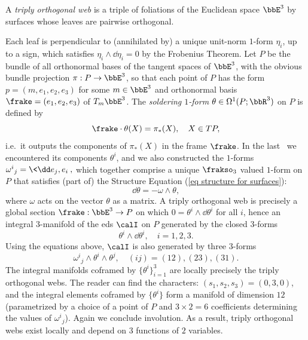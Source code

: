 \begin{example}
    A \emph{triply orthogonal web} is a triple of foliations of the Euclidean space $\bbE^3$ by surfaces whose leaves are pairwise orthogonal. 

    Each leaf is perpendicular to (annihilated by) a unique unit-norm $1$-form $\eta_i$, up to a sign, which satisfies $\eta_i\wedge\dd\eta_i=0$ by the Frobenius Theorem. Let $P$ be the bundle of all orthonormal bases of the tangent spaces of $\bbE^3$, with the obvious bundle projection $\pi:P\to \bbE^3$, so that each point of $P$ has the form $p=(m,e_1,e_2,e_3)$ for some $m\in \bbE^3$ and orthonormal basis $\frake=(e_1,e_2,e_3)$ of $T_{m}\bbE^3$. The \emph{soldering $1$-form} $\theta\in \Omega^1(P;\bbR^3)$ on $P$ is defined by 
    \[\frake\cdot \theta(X)=\pi_\ast(X),\quad X\in TP,\]
    i.e.\ it outputs the components of $\pi_\ast(X)$ in the frame $\frake$. In the last \subsect\ we encountered its components $\theta^i$, and we also constructed the $1$-forms 
    $\omega^i{}_j=\<\dd e_j,e_i\>,$
    which together comprise a unique $\frakso_3$ valued $1$-form on $P$ that satisfies (part of) the Structure Equation (\ref{eq structure for surfaces}):
    \[\dd \theta=-\omega\wedge\theta,\]
    where $\omega$ acts on the vector $\theta$ as a matrix. A triply orthogonal web is precisely a global section $\frake:\bbE^3\to P$  on which $0=\theta^i\wedge \dd\theta^i$ for all $i$, hence an integral $3$-manifold of the \gls{eds} $\calI$ on $P$ generated by the closed $3$-forms 
    \[\theta^i\wedge\dd\theta^i,\quad i=1,2,3.\]
    Using the equations above, $\calI$ is also generated by three $3$-forms
    \[\omega^i{}_j\wedge\theta^i\wedge\theta^j,\quad (ij)=(12),(23),(31).\]
    The integral manifolds coframed by $\{\theta^i\}_{i=1}^3$ are locally precisely the triply orthogonal webs. The reader can find the characters: $(s_1,s_2,s_3)=(0,3,0)$, and the integral elements coframed by $\{\theta^i\}$ form a manifold of dimension $12$ (parametrized by a choice of a point of $P$ and $3\times 2=6$ coefficients determining the values of $\omega^i{}_j$). Again we conclude involution. As a result, triply orthogonal webs exist locally and depend on $3$ functions of $2$ variables.
\end{example}



